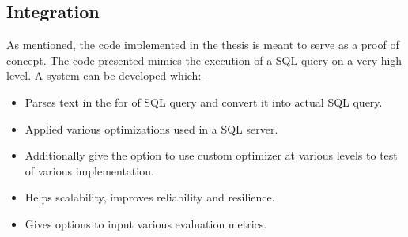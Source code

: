 \subsection{Integration}
As mentioned, the code implemented in the thesis is meant to serve as a proof of concept. The code presented mimics the execution of a SQL query on a very high level. A system can be developed which:-
\begin{itemize}
    \item Parses text in the for of SQL query and convert it into actual SQL query.
    \item Applied various optimizations used in a SQL server.
    \item Additionally give the option to use custom optimizer at various levels to test of various implementation.
    \item Helps scalability, improves reliability and resilience.
    \item Gives options to input various evaluation metrics.
\end{itemize}
